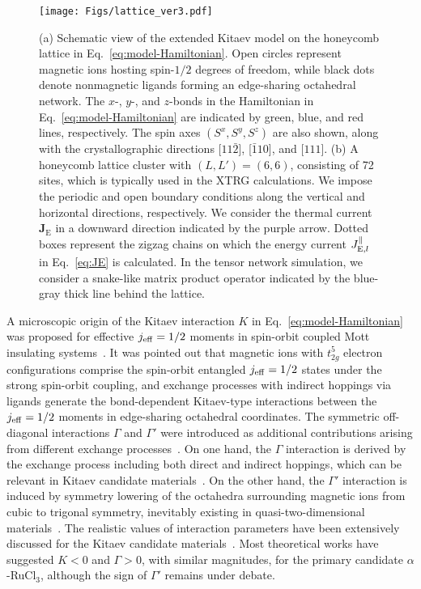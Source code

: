 \documentclass[twocolumn,superscriptaddress,showpacs, longbibliography, aps, prx]{revtex4-2}
\begin{document}
\begin{figure}
  \begin{center}
    \texttt{[image: Figs/lattice\_ver3.pdf]}    
  \end{center}
  \caption{
  (a) Schematic view of the extended Kitaev model on the honeycomb lattice in Eq.~\eqref{eq:model-Hamiltonian}. Open circles represent magnetic ions hosting spin-$1/2$ degrees of freedom, while black dots denote nonmagnetic ligands forming an edge-sharing octahedral network.
  The $x$-, $y$-, and $z$-bonds in the Hamiltonian in Eq.~\eqref{eq:model-Hamiltonian} are indicated by green, blue, and red lines, respectively. 
  The spin axes $(S^x, S^y, S^z)$ are also shown, along with the crystallographic directions [$11\bar{2}$], [$\bar{1}10$], and [$111$]. 
  (b) A honeycomb lattice cluster with  $(L, L') = (6, 6) $, consisting of 72 sites, which is typically used in the XTRG calculations. 
  We impose the periodic and open boundary conditions along the vertical and horizontal directions, respectively. 
  We consider the thermal current $\bm{J}_{\mathrm{E}}$ in a downward direction indicated by the purple arrow. 
  Dotted boxes represent the zigzag chains on which the energy current $J_{{\rm E},l}^\parallel$ in Eq.~\eqref{eq:JE} is calculated. 
  In the tensor network simulation, we consider a snake-like matrix product operator indicated by the blue-gray thick line behind the lattice.
  }
  \label{fig:lattice}
\end{figure}

A microscopic origin of the Kitaev interaction $K$ in Eq.~\eqref{eq:model-Hamiltonian} was proposed for effective $j_{\rm eff}=1/2$ moments in spin-orbit coupled Mott insulating systems~\cite{Jackeli_PRL2009}. 
It was pointed out that magnetic ions with $t_{2g}^5$ electron configurations comprise the spin-orbit entangled $j_{\rm eff}=1/2$ states under the strong spin-orbit coupling, and exchange processes with indirect hoppings via ligands generate the bond-dependent Kitaev-type interactions between the $j_{\rm eff}=1/2$ moments in edge-sharing octahedral coordinates. 
The symmetric off-diagonal interactions $\Gamma$ and $\Gamma'$ were introduced as additional contributions arising from different exchange processes~\cite{Rau2014}. 
On one hand, the $\Gamma$ interaction is derived by the exchange process including both direct and indirect hoppings, which can be relevant in Kitaev candidate materials~\cite{Yamaji2014,Winter2016,WinterTDBSGV2017,OkuboSYKSTI2017}. 
On the other hand, the $\Gamma'$ interaction is induced by symmetry lowering of the octahedra surrounding magnetic ions from cubic to trigonal symmetry, inevitably existing in quasi-two-dimensional materials~\cite{Rau2014}.
The realistic values of interaction parameters have been extensively discussed for the Kitaev candidate materials~\cite{Yamaji2016,Suzuki2018,laurell2020dynamical,Maksimov2020}.
Most theoretical works have suggested $K<0$ and $\Gamma>0$, with similar magnitudes, for the primary candidate $\alpha$-RuCl$_3$, although the sign of $\Gamma'$ remains under debate.
\end{document}
